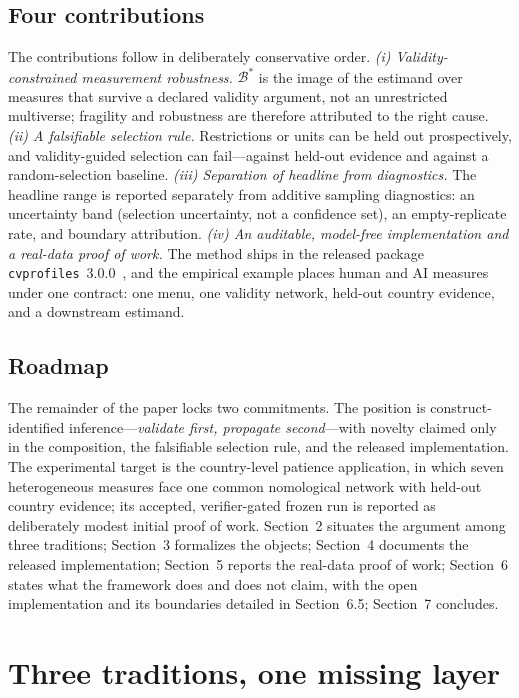 \documentclass[10pt,letterpaper]{article}
\newcommand{\cvp}{\texttt{cvprofiles}}
\newcommand{\Bset}{\mathcal{B}}
\begin{document}
\subsection{Four contributions}
The contributions follow in deliberately conservative order.
\textit{(i) Validity-constrained measurement robustness.}
$\Bset^*$ is the image of the estimand over measures that survive a declared validity argument, not an unrestricted multiverse; fragility and robustness are therefore attributed to the right cause.
\textit{(ii) A falsifiable selection rule.}
Restrictions or units can be held out prospectively, and validity-guided selection can fail---against held-out evidence and against a random-selection baseline.
\textit{(iii) Separation of headline from diagnostics.}
The headline range is reported separately from additive sampling diagnostics: an uncertainty band (selection uncertainty, not a confidence set), an empty-replicate rate, and boundary attribution.
\textit{(iv) An auditable, model-free implementation and a real-data proof of work.}
The method ships in the released package \cvp{}~3.0.0~\cite{cvprofiles}, and the empirical example places human and AI measures under one contract: one menu, one validity network, held-out country evidence, and a downstream estimand.

\subsection{Roadmap}
The remainder of the paper locks two commitments.
The position is construct-identified inference---\emph{validate first, propagate second}---with novelty claimed only in the composition, the falsifiable selection rule, and the released implementation.
The experimental target is the country-level patience application, in which seven heterogeneous measures face one common nomological network with held-out country evidence; its accepted, verifier-gated frozen run is reported as deliberately modest initial proof of work.
Section~2 situates the argument among three traditions; Section~3 formalizes the objects; Section~4 documents the released implementation; Section~5 reports the real-data proof of work; Section~6 states what the framework does and does not claim, with the open implementation and its boundaries detailed in Section~6.5; Section~7 concludes.

\section{Three traditions, one missing layer}
\label{sec:traditions}
\end{document}
